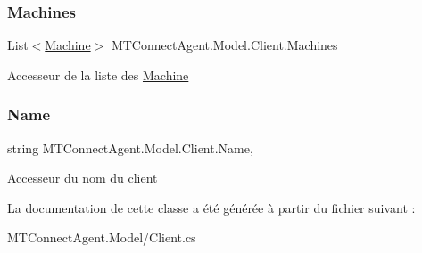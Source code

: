 \subsubsection{\texorpdfstring{Machines}{Machines}}
{\footnotesize\ttfamily List$<$\mbox{\hyperlink{class_m_t_connect_agent_1_1_model_1_1_machine}{Machine}}$>$ M\+T\+Connect\+Agent.\+Model.\+Client.\+Machines\hspace{0.3cm}{\ttfamily [get]}}



Accesseur de la liste des \mbox{\hyperlink{class_m_t_connect_agent_1_1_model_1_1_machine}{Machine}} 

\mbox{\label{class_m_t_connect_agent_1_1_model_1_1_client_ad3cab431fa147d3fbbd8ba015d6928bc}} 
\subsubsection{\texorpdfstring{Name}{Name}}
{\footnotesize\ttfamily string M\+T\+Connect\+Agent.\+Model.\+Client.\+Name\hspace{0.3cm}{\ttfamily [get]}, {\ttfamily [set]}}



Accesseur du nom du client 



La documentation de cette classe a été générée à partir du fichier suivant \+:\begin{DoxyCompactItemize}
\item 
M\+T\+Connect\+Agent.\+Model/Client.\+cs\end{DoxyCompactItemize}
